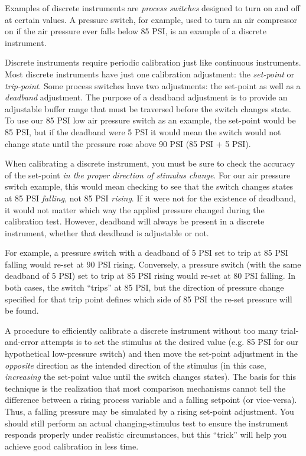 Examples of discrete instruments are \textit{process switches} designed to turn on and off at certain values.  A pressure switch, for example, used to turn an air compressor on if the air pressure ever falls below 85 PSI, is an example of a discrete instrument.

Discrete instruments require periodic calibration just like continuous instruments.  Most discrete instruments have just one calibration adjustment: the \textit{set-point} or \textit{trip-point}.  Some process switches have two adjustments: the set-point as well as a \textit{deadband} adjustment.  The purpose of a deadband adjustment is to provide an adjustable buffer range that must be traversed before the switch changes state.  To use our 85 PSI low air pressure switch as an example, the set-point would be 85 PSI, but if the deadband were 5 PSI it would mean the switch would not change state until the pressure rose above 90 PSI (85 PSI + 5 PSI).

When calibrating a discrete instrument, you must be sure to check the accuracy of the set-point \textit{in the proper direction of stimulus change}.  For our air pressure switch example, this would mean checking to see that the switch changes states at 85 PSI \textit{falling}, not 85 PSI \textit{rising}.  If it were not for the existence of deadband, it would not matter which way the applied pressure changed during the calibration test.  However, deadband will always be present in a discrete instrument, whether that deadband is adjustable or not.

For example, a pressure switch with a deadband of 5 PSI set to trip at 85 PSI falling would re-set at 90 PSI rising.  Conversely, a pressure switch (with the same deadband of 5 PSI) set to trip at 85 PSI rising would re-set at 80 PSI falling.  In both cases, the switch ``trips'' at 85 PSI, but the direction of pressure change specified for that trip point defines which side of 85 PSI the re-set pressure will be found.

A procedure to efficiently calibrate a discrete instrument without too many trial-and-error attempts is to set the stimulus at the desired value (e.g. 85 PSI for our hypothetical low-pressure switch) and then move the set-point adjustment in the \textit{opposite} direction as the intended direction of the stimulus (in this case, \textit{increasing} the set-point value until the switch changes states).  The basis for this technique is the realization that most comparison mechanisms cannot tell the difference between a rising process variable and a falling setpoint (or vice-versa).  Thus, a falling pressure may be simulated by a rising set-point adjustment.  You should still perform an actual changing-stimulus test to ensure the instrument responds properly under realistic circumstances, but this ``trick'' will help you achieve good calibration in less time.






